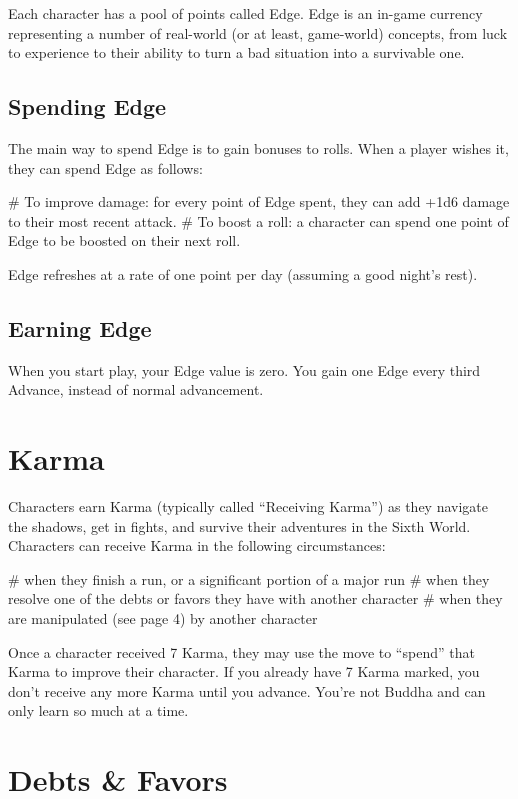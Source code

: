 Each character has a pool of points called Edge. Edge is an in-game currency representing a number of real-world (or at least, game-world) concepts, from luck to experience to their ability to turn a bad situation into a survivable one.

\subsection{Spending Edge}
The main way to spend Edge is to gain bonuses to rolls. When a player wishes it, they can spend Edge as follows:

\begin{easylist}
    # To improve damage: for every point of Edge spent, they can add +1d6 damage to their most recent attack.
    # To boost a roll: a character can spend one point of Edge to be boosted on their next roll.    
\end{easylist}

Edge refreshes at a rate of one point per day (assuming a good night’s rest).

\subsection{Earning Edge}
When you start play, your Edge value is zero. You gain one Edge every third Advance, instead of normal advancement.


\section{Karma}

Characters earn Karma (typically called ``Receiving Karma'') as they navigate the shadows, get in fights, and survive their adventures in the Sixth World. Characters can receive Karma in the following circumstances:

\begin{easylist}
# when they finish a run, or a significant portion of a major run
# when they resolve one of the debts or favors they have with another character
# when they are manipulated (see page 4) by another character
\end{easylist}

Once a character received 7 Karma, they may use the  move to ``spend'' that Karma to improve their character. If you already have 7 Karma marked, you don’t receive any more Karma until you advance. You're not Buddha and can only learn so much at a time.


\section{Debts \& Favors}

